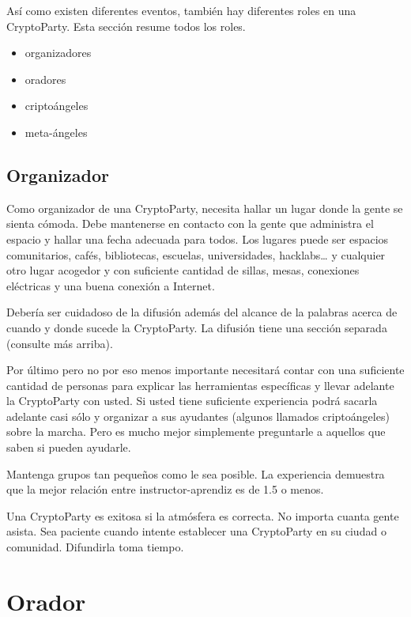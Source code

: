 \documentclass[10pt,a5paper,twoside,,]{book}
\providecommand{\tightlist}{%
  \setlength{\itemsep}{0pt}\setlength{\parskip}{0pt}}
\begin{document}
Así como existen diferentes eventos, también hay diferentes roles en una
CryptoParty. Esta sección resume todos los roles.

\begin{itemize}
\tightlist
\item
  organizadores
\item
  oradores
\item
  criptoángeles
\item
  meta-ángeles
\end{itemize}

\section{Organizador}\label{organizador}

Como organizador de una CryptoParty, necesita hallar un lugar donde la
gente se sienta cómoda. Debe mantenerse en contacto con la gente que
administra el espacio y hallar una fecha adecuada para todos. Los
lugares puede ser espacios comunitarios, cafés, bibliotecas, escuelas,
universidades, hacklabs\ldots{} y cualquier otro lugar acogedor y con
suficiente cantidad de sillas, mesas, conexiones eléctricas y una buena
conexión a Internet.

Debería ser cuidadoso de la difusión además del alcance de la palabras
acerca de cuando y donde sucede la CryptoParty. La difusión tiene una
sección separada (consulte más arriba).

Por último pero no por eso menos importante necesitará contar con una
suficiente cantidad de personas para explicar las herramientas
específicas y llevar adelante la CryptoParty con usted. Si usted tiene
suficiente experiencia podrá sacarla adelante casi sólo y organizar a
sus ayudantes (algunos llamados criptoángeles) sobre la marcha. Pero es
mucho mejor simplemente preguntarle a aquellos que saben si pueden
ayudarle.

Mantenga grupos tan pequeños como le sea posible. La experiencia
demuestra que la mejor relación entre instructor-aprendiz es de 1.5 o
menos.

Una CryptoParty es exitosa si la atmósfera es correcta. No importa
cuanta gente asista. Sea paciente cuando intente establecer una
CryptoParty en su ciudad o comunidad. Difundirla toma tiempo.

\chapter{Orador}\label{orador}
\end{document}
